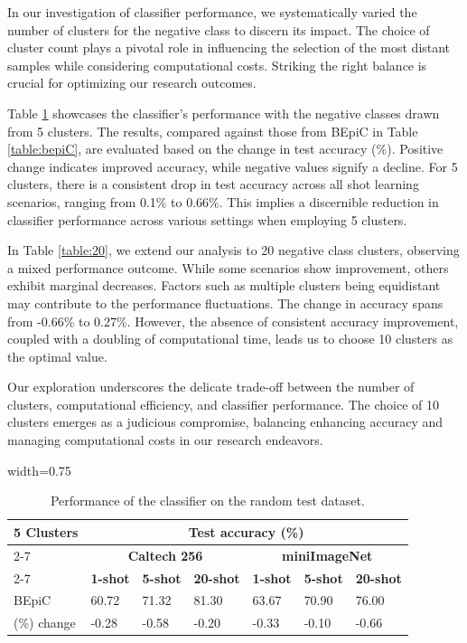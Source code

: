 In our investigation of classifier performance, we systematically varied the number of clusters for the negative class to discern its impact. The choice of cluster count plays a pivotal role in influencing the selection of the most distant samples while considering computational costs. Striking the right balance is crucial for optimizing our research outcomes.

Table \ref{table:5} showcases the classifier's performance with the negative classes drawn from 5 clusters. The results, compared against those from BEpiC in Table \ref{table:bepiC}, are evaluated based on the change in test accuracy (\%). Positive change indicates improved accuracy, while negative values signify a decline. For 5 clusters, there is a consistent drop in test accuracy across all shot learning scenarios, ranging from 0.1\% to 0.66\%. This implies a discernible reduction in classifier performance across various settings when employing 5 clusters.

In Table \ref{table:20}, we extend our analysis to 20 negative class clusters, observing a mixed performance outcome. While some scenarios show improvement, others exhibit marginal decreases. Factors such as multiple clusters being equidistant may contribute to the performance fluctuations. The change in accuracy spans from -0.66\% to 0.27\%. However, the absence of consistent accuracy improvement, coupled with a doubling of computational time, leads us to choose 10 clusters as the optimal value.

Our exploration underscores the delicate trade-off between the number of clusters, computational efficiency, and classifier performance. The choice of 10 clusters emerges as a judicious compromise, balancing enhancing accuracy and managing computational costs in our research endeavors.

\begin{table}[!ht]
\centering
\caption{Performance of the classifier on the random test dataset.}
\begin{adjustbox}{width=0.75\columnwidth}
\renewcommand{\arraystretch}{1.5} 
\begin{tabular}{|l|l|l|l|l|l|l|}
 \hline
\multirow{2}{*}{\textbf{5 Clusters} }  & \multicolumn{6}{c|}{\textbf{Test accuracy (\%)}}                             \\
\cline{2-7}
                            & \multicolumn{3}{c|}{\textbf{Caltech 256}} & \multicolumn{3}{c|}{\textbf{miniImageNet}} \\ \cline{2-7}
                            & \textbf{1-shot}   & \textbf{5-shot}   & \textbf{20-shot}   & \textbf{1-shot}   & \textbf{5-shot}   & \textbf{20-shot}   \\ \hline
BEpiC                     & 60.72    & 71.32    & 81.30      & 63.67     & 70.90     & 76.00        \\ \hline
(\%) change                & -0.28    & -0.58    & -0.20      & -0.33     & -0.10     & -0.66    \\ \hline
\end{tabular}
\end{adjustbox}
\label{table:5}
\end{table}

